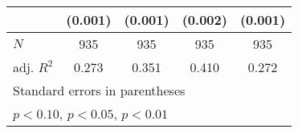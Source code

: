 {\begin{tabular}{l*{4}{c}}
            &     (0.001)         &     (0.001)         &     (0.002)         &     (0.001)         \\
\hline
\(N\)       &         935         &         935         &         935         &         935         \\
adj. \(R^{2}\)&       0.273         &       0.351         &       0.410         &       0.272         \\
\hline\hline
\multicolumn{5}{l}{\footnotesize Standard errors in parentheses}\\
\multicolumn{5}{l}{\footnotesize \sym{*} \(p<0.10\), \sym{**} \(p<0.05\), \sym{***} \(p<0.01\)}\\
\end{tabular}
}
